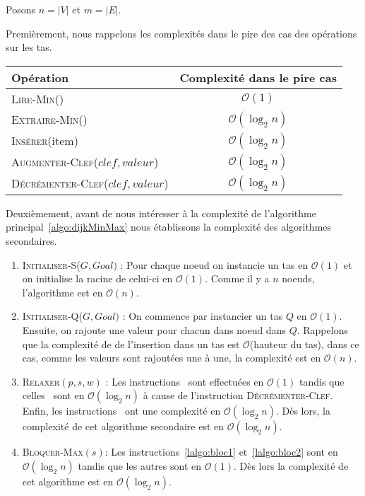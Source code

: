 Posons $n = |V|$ et $ m = |E|$.

Premièrement, nous rappelons les complexités dans le pire des cas des opérations sur les tas.

\begin{center}
	\begin{tabular}{|l|c|}
		\hline
		Opération & Complexité dans le pire cas \\
		\hline
		\hline
		\textsc{Lire-Min()} & $\mathcal{O}(1)$\\
		\hline
		\textsc{Extraire-Min()} & $\mathcal{O}(\log_2 n)$\\
		\hline
		\textsc{Insérer}(item) & $\mathcal{O}(\log_2 n)$\\
		\hline
		\textsc{Augmenter-Clef}($clef,valeur$) & $\mathcal{O}(\log_2 n)$\\
		\hline
		\textsc{Décrémenter-Clef}($clef,valeur$) & $\mathcal{O}(\log_2 n)$\\
		\hline
		
	\end{tabular}
\end{center}

Deuxièmement, avant de nous intéresser à la complexité de l'algorithme principal~\ref{algo:dijkMinMax} nous établissons la complexité des algorithmes secondaires.

\begin{enumerate}
	\item \textsc{Initialiser-S}($G,Goal)$ : Pour chaque noeud on instancie un tas en $\mathcal{O}(1)$ et on initialise la racine de celui-ci en $\mathcal{O}(1)$. Comme il y a $n$ noeuds, l'algorithme est en $\mathcal{O}(n)$.
	
	\item \textsc{Initialiser-Q}($G,Goal)$ : On  commence par instancier un tas $Q$ en $\mathcal{O}(1)$. Ensuite, on rajoute une valeur pour chacun dans noeud dans $Q$. Rappelons que la complexité de de l'insertion dans un tas est $\mathcal{O}$(hauteur du tas), dans ce cas, comme les valeurs sont rajoutées une à une, la complexité est en $\mathcal{O}(n)$.
	
	\item \textsc{Relaxer}$(p, s, w)$ : Les instructions~ sont effectuées en $\mathcal{O}(1)$ tandis que celles~ sont en $\mathcal{O}(\log_2 n)$ à cause de l'instruction \textsc{Décrémenter-Clef}. Enfin, les instructions~ ont une complexité en $\mathcal{O}(\log_2 n)$. Dès lors, la complexité de cet algorithme secondaire est en $\mathcal{O}(\log_2 n)$.
	
	 \item \textsc {Bloquer-Max}$(s)$: Les instructions~\ref{lalgo:bloc1} et~\ref{lalgo:bloc2} sont en $\mathcal{O}(\log_2 n)$ tandis que les autres sont en $\mathcal{O}(1)$. Dès lors la complexité de cet algorithme est en $\mathcal{O}(\log_2 n)$.
	
	
\end{enumerate}

